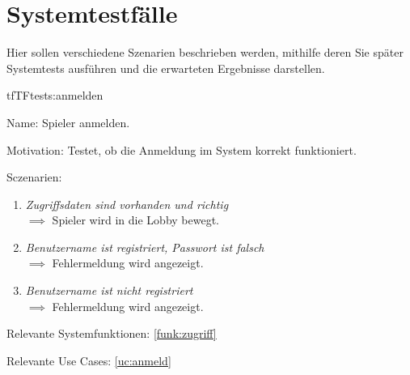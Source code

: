 \chapter{Systemtestfälle}

Hier sollen verschiedene Szenarien beschrieben werden, mithilfe deren Sie später Systemtests ausführen und die erwarteten Ergebnisse darstellen.

\setcounter{tf}{10}

\begin{description}[leftmargin=5em, style=sameline]

\begin{lhp}{tf}{TF}{tests:anmelden}
	\item [Name:] Spieler anmelden.
	\item [Motivation:] Testet, ob die Anmeldung im System korrekt funktioniert.
	\item [Sczenarien:] \hfill
		\begin{enumerate}
			\item \textit{Zugriffsdaten sind vorhanden und richtig} \\ $\implies$ Spieler wird in die Lobby bewegt.
			\item \textit{Benutzername ist registriert, Passwort ist falsch} \\ $\implies$ Fehlermeldung wird angezeigt.
			\item \textit{Benutzername ist nicht registriert} \\ $\implies$ Fehlermeldung wird angezeigt.
		\end{enumerate}
	\item [Relevante Systemfunktionen:] \ref{funk:zugriff}
	\item [Relevante Use Cases:] \ref{uc:anmeld}
\end{lhp}

\end{description}

